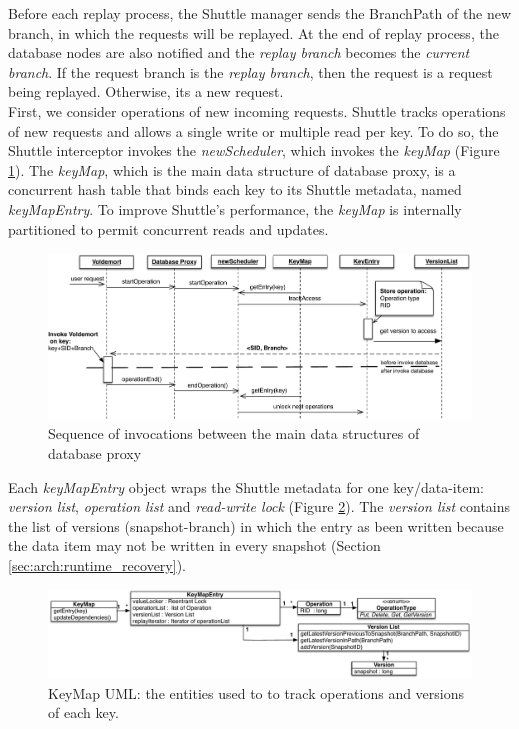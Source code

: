 Before each replay process, the Shuttle manager sends the BranchPath of the new branch, in which the requests will be replayed. At the end of replay process, the database nodes are also notified and the \textit{replay branch} becomes the \textit{current branch}. If the request branch is the \textit{replay branch}, then the request is a request being replayed. Otherwise, its a new request.\\


First, we consider operations of new incoming requests. Shuttle tracks operations of new requests and allows a single write or multiple read per key. To do so, the Shuttle interceptor invokes the \emph{newScheduler}, which invokes the \emph{keyMap} (Figure \ref{fig:sequence_normal}). The \emph{keyMap}, which is the main data structure of database proxy, is a concurrent hash table that binds each  key to its Shuttle metadata, named \emph{keyMapEntry}. To improve Shuttle's performance, the \emph{keyMap} is internally partitioned to permit concurrent reads and updates.

\begin{figure}
  \centering
  \includegraphics[width=\textwidth]{arch/operation_database}
  \caption{Sequence of invocations between the main data structures of database proxy }
  \label{fig:sequence_normal}
\end{figure}


Each \emph{keyMapEntry} object wraps the Shuttle metadata for one key/data-item: \emph{version list}, \emph{operation list} and \emph{read-write lock} (Figure \ref{fig:keymap}). The \emph{version list} contains the list of versions (snapshot-branch) in which the entry as been written because the data item may not be written in every snapshot (Section \ref{sec:arch:runtime_recovery}). 

\begin{figure}
  \centering
  \includegraphics[width=\textwidth]{arch/keymap}
  \caption{KeyMap UML: the entities used to to track operations and versions of each key.}
  \label{fig:keymap}
\end{figure}


